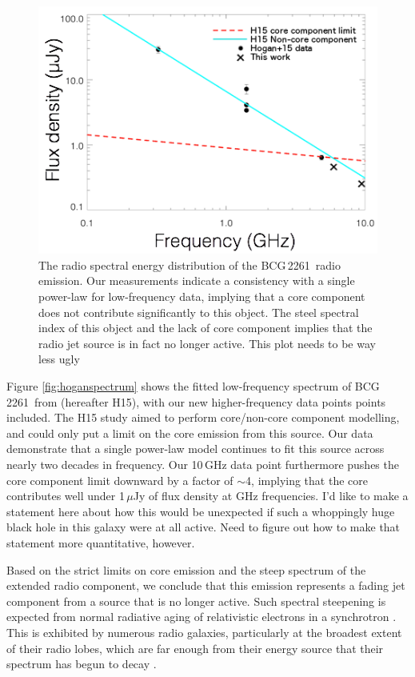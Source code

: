 \documentclass[useAMS,usenatbib]{emulateapj}
\newcommand{\src}{BCG\,2261}
\newcommand{\fixme}[1]{{\color{red} #1 }}
\begin{document}
\begin{figure}
\centering
\includegraphics[width=0.95\columnwidth]{figs/spectrum-hoganplusus.png}
\caption{The radio spectral energy distribution of the \src\ radio emission. Our measurements indicate a consistency with a single power-law for low-frequency data, implying that a core component does not contribute significantly to this object. The steel spectral index of this object and the lack of core component implies that the radio jet source is in fact no longer active. \fixme{This plot needs to be way less ugly}}\label{fig:hoganspectrum}
\label{fig:last}
\vspace{1mm}
\end{figure}

Figure \ref{fig:hoganspectrum} shows the fitted low-frequency spectrum of \src\ from \citet{hogan+15} (hereafter H15), with our new higher-frequency data points points included. The H15 study aimed to perform core/non-core component modelling, and could only put a limit on the core emission from this source. Our data demonstrate that a single power-law model continues to fit this source across nearly two decades in frequency. Our 10\,GHz data point furthermore pushes the core component limit downward by a factor of $\sim$4, implying that the core contributes well under 1\,$\mu$Jy of flux density at GHz frequencies.  \fixme{I'd like to make a statement here about how this would be unexpected if such a whoppingly huge black hole in this galaxy were at all active. Need to figure out how to make that statement more quantitative, however.}

Based on the strict limits on core emission and the steep spectrum of the extended radio component, we conclude that this emission represents a fading jet component from a source that is no longer active. Such spectral steepening is expected from normal radiative aging of relativistic electrons in a synchrotron \citep{Scheuer+Williams1968}. This is exhibited by numerous radio galaxies, particularly at the broadest extent of their radio lobes, which are far enough from their energy source that their spectrum has begun to decay \citep{carilli+98}.
\end{document}
